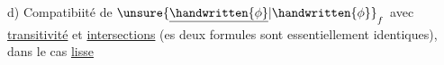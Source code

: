 d) Compatibiité de $\unsure{\underline{\handwritten{\phi}}|\handwritten{\phi}}_f$ avec \uline{transitivité} et \uline{intersections} (es deux formules sont essentiellement identiques), dans le cas \uline{lisse}\handwritten{\unsure{,|;}}

